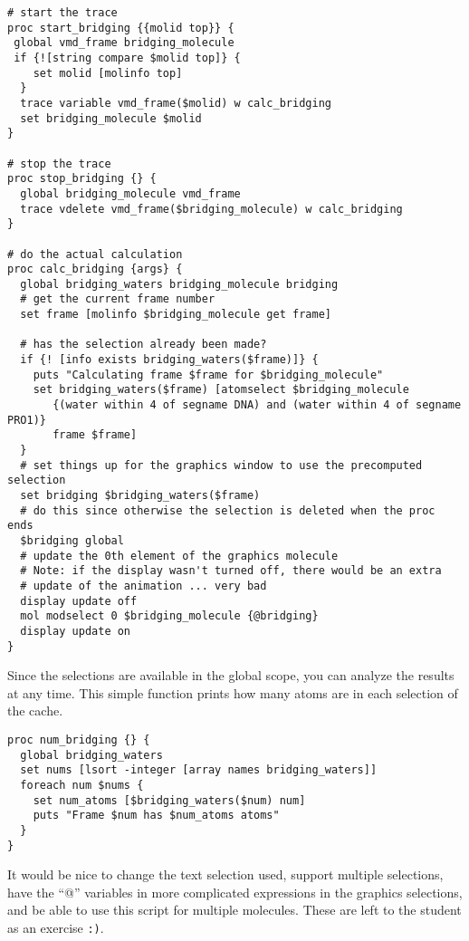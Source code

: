 \begin{verbatim}
# start the trace
proc start_bridging {{molid top}} {
 global vmd_frame bridging_molecule
 if {![string compare $molid top]} {
    set molid [molinfo top]
  }
  trace variable vmd_frame($molid) w calc_bridging
  set bridging_molecule $molid
}

# stop the trace
proc stop_bridging {} {
  global bridging_molecule vmd_frame
  trace vdelete vmd_frame($bridging_molecule) w calc_bridging
}

# do the actual calculation
proc calc_bridging {args} {
  global bridging_waters bridging_molecule bridging
  # get the current frame number
  set frame [molinfo $bridging_molecule get frame]

  # has the selection already been made?
  if {! [info exists bridging_waters($frame)]} {
    puts "Calculating frame $frame for $bridging_molecule"
    set bridging_waters($frame) [atomselect $bridging_molecule 
       {(water within 4 of segname DNA) and (water within 4 of segname PRO1)} 
       frame $frame]
  }
  # set things up for the graphics window to use the precomputed selection
  set bridging $bridging_waters($frame)
  # do this since otherwise the selection is deleted when the proc ends
  $bridging global
  # update the 0th element of the graphics molecule
  # Note: if the display wasn't turned off, there would be an extra
  # update of the animation ... very bad
  display update off
  mol modselect 0 $bridging_molecule {@bridging}
  display update on
}

\end{verbatim}

Since the selections are available in the global scope, you can analyze
the results at any time.  This simple function prints how many atoms
are in each selection of the cache.

\begin{verbatim}
proc num_bridging {} {
  global bridging_waters
  set nums [lsort -integer [array names bridging_waters]]
  foreach num $nums {
    set num_atoms [$bridging_waters($num) num]
    puts "Frame $num has $num_atoms atoms"
  }
}
\end{verbatim}

It would be nice to change the text selection used, support multiple
selections, have the ``@'' variables in more complicated expressions
in the graphics selections, and be able to use this script for
multiple molecules.  These are left to the student as an exercise
{\tt :)}.



